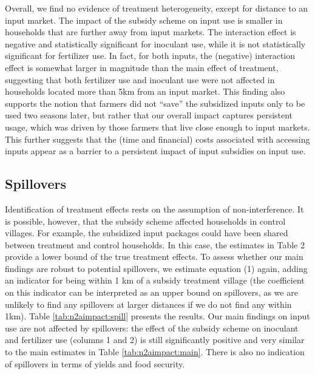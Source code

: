 Overall, we find no evidence of treatment heterogeneity, except for distance to an input market. The impact of the subsidy scheme on input use is smaller in households that are further away from input markets. The interaction effect is negative and statistically significant for inoculant use, while it is not statistically significant for fertilizer use. In fact, for both inputs, the (negative) interaction effect is somewhat larger in magnitude than the main effect of treatment, suggesting that both fertilizer use and inoculant use were not affected in households located more than 5km from an input market. This finding also supports the notion that farmers did not “save” the subsidized inputs only to be used two seasons later, but rather that our overall impact captures persistent usage, which was driven by those farmers that live close enough to input markets. This further suggests that the (time and financial) costs associated with accessing inputs appear as a barrier to a persistent impact of input subsidies on input use. 

\subsection{Spillovers}
Identification of treatment effects rests on the assumption of non-interference. It is possible, however, that the subsidy scheme affected households in control villages. For example, the subsidized input packages could have been shared between treatment and control households. In this case, the estimates in Table 2 provide a lower bound of the true treatment effects. To assess whether our main findings are robust to potential spillovers, we estimate equation (1) again, adding an indicator for being within 1 km of a subsidy treatment village (the coefficient on this indicator can be interpreted as an upper bound on spillovers, as we are unlikely to find any spillovers at larger distances if we do not find any within 1km). Table \ref{tab:n2aimpact:spill} presents the results. Our main findings on input use are not affected by spillovers: the effect of the subsidy scheme on inoculant and fertilizer use (columns 1 and 2) is still significantly positive and very similar to the main estimates in Table \ref{tab:n2aimpact:main}. There is also no indication of spillovers in terms of yields and food security.

